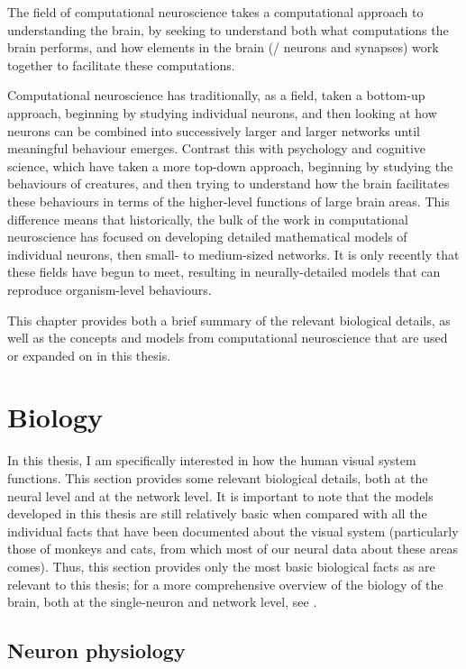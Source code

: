 The field of computational neuroscience takes a
computational approach to understanding the brain,
by seeking to understand both what computations the brain performs,
and how elements in the brain (\ie/ neurons and synapses)
work together to facilitate these computations.

Computational neuroscience has traditionally, as a field,
taken a bottom-up approach,
beginning by studying individual neurons,
and then looking at how neurons can be combined into successively
larger and larger networks until meaningful behaviour emerges.
Contrast this with psychology and cognitive science,
which have taken a more top-down approach,
beginning by studying the behaviours of creatures,
and then trying to understand how the brain facilitates these behaviours
in terms of the higher-level functions of large brain areas.
This difference means that historically,
the bulk of the work in computational neuroscience has focused
on developing detailed mathematical models of individual neurons,
then small- to medium-sized networks.
It is only recently that these fields have begun to meet,
resulting in neurally-detailed models
that can reproduce organism-level behaviours.

This chapter provides both a brief summary of
the relevant biological details,
as well as the concepts and models from computational neuroscience
that are used or expanded on in this thesis.


\section{Biology}

In this thesis, I am specifically interested
in how the human visual system functions.
This section provides some relevant biological details,
both at the neural level and at the network level.
It is important to note that the models developed in this thesis
are still relatively basic when compared with
all the individual facts that have been documented about the visual system
(particularly those of monkeys and cats,
from which most of our neural data about these areas comes).
Thus, this section provides only the most basic biological facts
as are relevant to this thesis;
for a more comprehensive overview of the biology of the brain,
both at the single-neuron and network level,
see \textcite{Kandel2012}.


\subsection{Neuron physiology}

